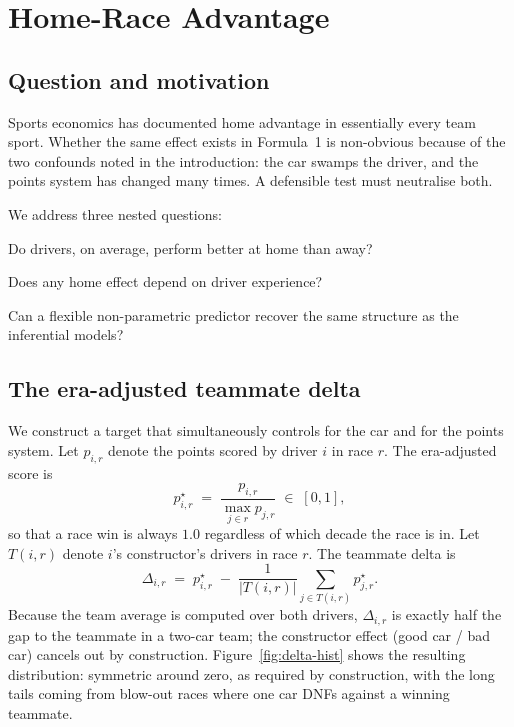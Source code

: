 \documentclass[11pt,a4paper]{article}
\theoremstyle{remark}
\begin{document}
\section{Home-Race Advantage}\label{sec:home}

\subsection{Question and motivation}
Sports economics has documented home advantage in essentially every
team sport. Whether the same effect exists in Formula~1 is non-obvious
because of the two confounds noted in the introduction: the car
swamps the driver, and the points system has changed many times.
A defensible test must neutralise both.

We address three nested questions:
\begin{description}[leftmargin=10pt]
  \item[RQ1.] Do drivers, on average, perform better at home than away?
  \item[RQ2.] Does any home effect depend on driver experience?
  \item[RQ3.] Can a flexible non-parametric predictor recover the
  same structure as the inferential models?
\end{description}

\subsection{The era-adjusted teammate delta}
We construct a target that simultaneously controls for the car and
for the points system. Let $p_{i,r}$ denote the points scored by
driver $i$ in race $r$. The era-adjusted score is
\begin{equation}
p^\star_{i,r}\;=\;\frac{p_{i,r}}{\max_{j\in r}p_{j,r}}\;\in\;[0,1],
\end{equation}
so that a race win is always $1.0$ regardless of which decade the
race is in. Let $T(i,r)$ denote $i$'s constructor's drivers in race
$r$. The teammate delta is
\begin{equation}\label{eq:delta}
\Delta_{i,r}\;=\;p^\star_{i,r}\;-\;\frac{1}{|T(i,r)|}\sum_{j\in T(i,r)} p^\star_{j,r}.
\end{equation}
Because the team average is computed over both drivers, $\Delta_{i,r}$
is exactly half the gap to the teammate in a two-car team; the
constructor effect (good car / bad car) cancels out by construction.
Figure~\ref{fig:delta-hist} shows the resulting distribution: symmetric
around zero, as required by construction, with the long tails coming
from blow-out races where one car DNFs against a winning teammate.
\end{document}

